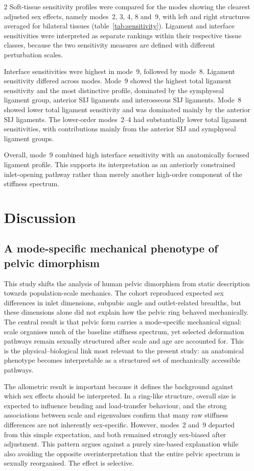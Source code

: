 \documentclass[openacc]{rsproca_new}
\begin{document}
\begin{multicols}{2}
Soft-tissue sensitivity profiles were compared for the modes showing the clearest adjusted sex effects, namely modes~2, 3, 4, 8 and~9, with left and right structures averaged for bilateral tissues (table~\ref{tab:sensitivity}). Ligament and interface sensitivities were interpreted as separate rankings within their respective tissue classes, because the two sensitivity measures are defined with different perturbation scales.

Interface sensitivities were highest in mode~9, followed by mode~8. Ligament sensitivity differed across modes. Mode~9 showed the highest total ligament sensitivity and the most distinctive profile, dominated by the symphyseal ligament group, anterior SIJ ligaments and interosseous SIJ ligaments. Mode~8 showed lower total ligament sensitivity and was dominated mainly by the anterior SIJ ligaments. The lower-order modes~2--4 had substantially lower total ligament sensitivities, with contributions mainly from the anterior SIJ and symphyseal ligament groups.

Overall, mode~9 combined high interface sensitivity with an anatomically focused ligament profile. This supports its interpretation as an anteriorly constrained inlet-opening pathway rather than merely another high-order component of the stiffness spectrum.

\section{Discussion}
\subsection{A mode-specific mechanical phenotype of pelvic dimorphism}

This study shifts the analysis of human pelvic dimorphism from static description towards population-scale mechanics. The cohort reproduced expected sex differences in inlet dimensions, subpubic angle and outlet-related breadths, but these dimensions alone did not explain how the pelvic ring behaved mechanically. The central result is that pelvic form carries a mode-specific mechanical signal: scale organises much of the baseline stiffness spectrum, yet selected deformation pathways remain sexually structured after scale and age are accounted for. This is the physical--biological link most relevant to the present study: an anatomical phenotype becomes interpretable as a structured set of mechanically accessible pathways.

The allometric result is important because it defines the background against which sex effects should be interpreted. In a ring-like structure, overall size is expected to influence bending and load-transfer behaviour, and the strong associations between scale and eigenvalues confirm that many raw stiffness differences are not inherently sex-specific. However, modes~2 and~9 departed from this simple expectation, and both remained strongly sex-biased after adjustment. This pattern argues against a purely size-based explanation while also avoiding the opposite overinterpretation that the entire pelvic spectrum is sexually reorganised. The effect is selective.


\end{multicols}
\end{document}
